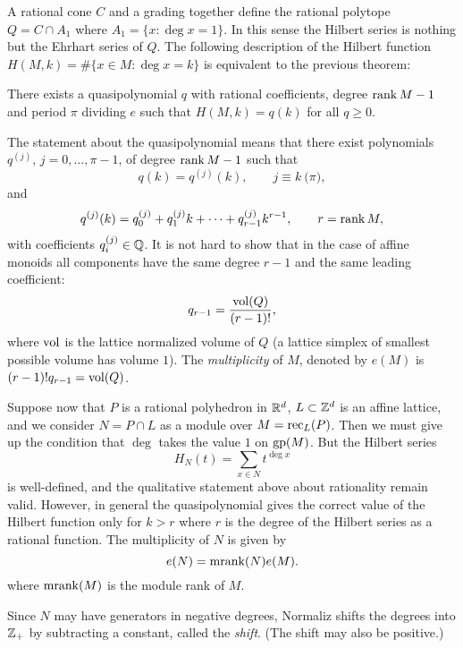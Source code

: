 A rational cone $C$ and a grading together define the rational
polytope $Q=C\cap A_1$ where $A_1=\{x:\deg x=1\}$. In this
sense the Hilbert series is nothing but the Ehrhart series of
$Q$.
The following description of the Hilbert function $H(M,k)=\#\{x\in M: \deg x=k\}$ is equivalent to the previous theorem:

\begin{theorem}
	There exists a quasipolynomial $q$ with rational coefficients, degree $\operatorname{rank} M-1$ and period $\pi$ dividing $e$ such that $H(M,k)=q(k)$ for all $q\ge0$.
\end{theorem}

The statement about the quasipolynomial means that there exist
polynomials $q^{(j)}$, $j=0,\dots,\pi-1$, of degree $\operatorname{rank} M-1$ such that
$$
q(k)=q^{(j)}(k),\qquad j\equiv k\pod \pi,
$$
and
$$
q^{(j)}(k)=q^{(j)}_0+q^{(j)}_1k+\dots+q^{(j)}_{r-1}k^{r-1},\qquad r=\operatorname{rank} M,
$$
with coefficients $q^{(j)}_i\in {\mathbb Q}$. It is not hard to show that in the case of affine monoids all components have the same degree $r-1$ and the same leading coefficient:
$$
q_{r-1}=\frac{\operatorname{vol}(Q)}{(r-1)!},
$$
where $\operatorname{vol}$ is the lattice normalized volume of $Q$ (a lattice simplex of smallest possible volume has volume $1$). The \emph{multiplicity} of $M$, denoted by $e(M)$ is $(r-1)!q_{r-1}=\operatorname{vol}(Q)$.

Suppose now that $P$ is a rational polyhedron in ${\mathbb R}^d$, $L\subset{\mathbb Z}^d$ is an affine lattice, and we consider $N=P\cap L$ as a module over $M=\operatorname{rec}_L(P)$. Then we must give up the condition that $\deg$ takes the value $1$ on $\operatorname{gp}(M)$. But the Hilbert series
$$
H_N(t)=\sum_{x\in N} t^{\deg x}
$$
is well-defined, and the qualitative statement above about rationality remain valid. However, in general the quasipolynomial gives the correct value of the Hilbert function only for $k>r$ where $r$ is the degree of the Hilbert series as a rational function. The multiplicity of $N$ is given by
$$
e(N)=\operatorname{mrank}(N)e(M).
$$
where $\operatorname{mrank}(M)$ is the module rank of $M$.

Since $N$ may have generators in negative degrees, Normaliz shifts the degrees into ${\mathbb Z}_+$ by subtracting a constant, called the \emph{shift}. (The shift may also be positive.)

